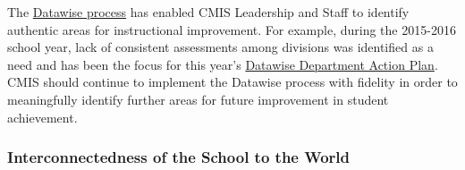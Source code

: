 \begin{findings}
The \href{https://drive.google.com/a/cmis.ac.th/file/d/0B71_pYxcTLo-OExlV0Y5UVFBNVU/view?usp=sharing}{Datawise process} has enabled CMIS Leadership and Staff to identify authentic areas for instructional improvement. For example, during the 2015-2016 school year, lack of consistent assessments among divisions was identified as a need and has been the focus for this year’s \href{https://docs.google.com/a/cmis.ac.th/document/d/1ioGkUkxTr5hRC_Vn4TDy7FcKHwcaWzBYNEeIConfXA4/edit?usp=sharing}{Datawise Department Action Plan}. CMIS should continue to implement the Datawise process with fidelity in order to meaningfully identify further areas for future improvement in student achievement.
\end{findings}

\subsubsection{Interconnectedness of the School to the World}



